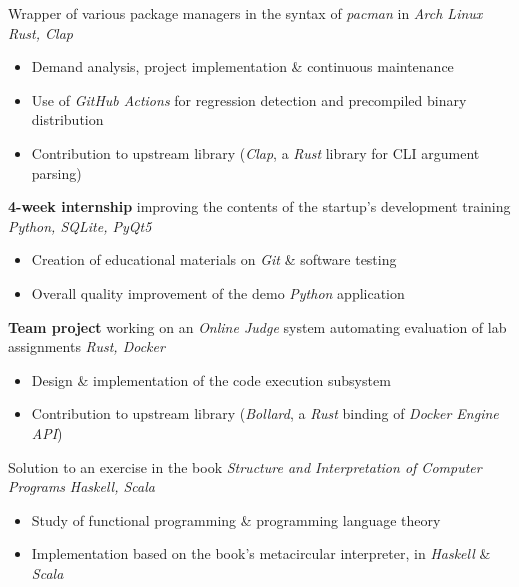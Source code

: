 \documentclass{resume}
\begin{document}
Wrapper of various package managers in the syntax of \textit{pacman} in \textit{Arch Linux} \hfill \textit{Rust, Clap}
\begin{itemize}
  \item Demand analysis, project implementation \& continuous maintenance
  \item Use of \textit{GitHub Actions} for regression detection and precompiled binary distribution
  \item Contribution to upstream library (\textit{Clap}, a \textit{Rust} library for CLI argument parsing)
\end{itemize}

\textbf{4-week internship} improving the contents of the startup's development training \hfill \textit{Python, SQLite, PyQt5}
\begin{itemize}
  \item Creation of educational materials on \textit{Git} \& software testing
  \item Overall quality improvement of the demo \textit{Python} application
\end{itemize}

\textbf{Team project} working on an \textit{Online Judge} system automating evaluation of lab assignments \hfill \textit{Rust, Docker}
\begin{itemize}
  \item Design \& implementation of the code execution subsystem
  \item Contribution to upstream library (\textit{Bollard}, a \textit{Rust} binding of \textit{Docker Engine API})
\end{itemize}

Solution to an exercise in the book \textit{Structure and Interpretation of Computer Programs} \hfill \textit{Haskell, Scala}
\begin{itemize}
  \item Study of functional programming \& programming language theory
  \item Implementation based on the book's metacircular interpreter, in \textit{Haskell} \& \textit{Scala}
\end{itemize}
\end{document}
